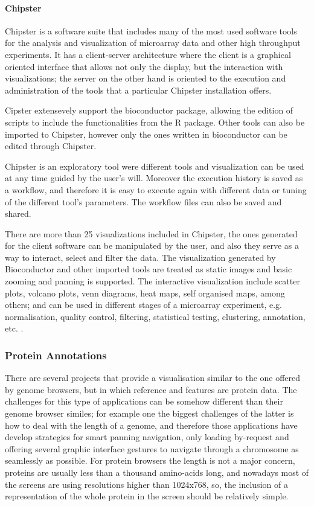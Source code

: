 \paragraph{Chipster}
Chipster is a software suite that includes many of the most used software tools for the analysis and visualization of microarray data and other high throughput experiments. It has a client-server architecture where the client is a graphical oriented interface that allows not only the display, but the interaction with visualizations; the server on the other hand is oriented to the execution and administration of the tools that a particular Chipster installation offers.

Cipster extensevely support the bioconductor package, allowing the edition of scripts to include the functionalities from the R package. Other tools can also be imported to Chipster, however only the ones written in bioconductor can be edited through Chipster.

Chipster is an exploratory tool were different tools and visualization can be used at any time guided by the user's will. Moreover the execution history is saved as a workflow, and therefore it is easy to execute again with different data or tuning of the different tool's parameters. The workflow files can also be saved and shared.

There are more than 25 visualizations included in Chipster, the ones generated for the client software can be manipulated by the user, and also they serve as a way to interact, select and filter the data. The visualization generated by Bioconductor and other imported tools are treated as static images and basic zooming and panning is supported. The interactive visualization include scatter plots, volcano plots, venn diagrams, heat maps, self organised maps, among others; and can be used in different stages of a microarray experiment, e.g. normalisation, quality control, filtering, statistical testing, clustering, annotation, etc. \cite{KAL2011}.	


\subsubsection{Protein Annotations}
There are several projects that provide a visualisation similar to the one offered by genome browsers, but in which reference and features are protein data. The challenges for this type of applications can be somehow different than their genome browser similes; for example one the biggest challenges of the latter is how to deal with the length of a genome, and therefore those applications have develop strategies for smart panning navigation, only loading by-request and offering several graphic interface gestures to navigate through a chromosome as seamlessly as possible. For protein browsers the length is not a major concern, proteins are usually less than a thousand amino-acids long, and nowadays most of the screens are using resolutions higher than 1024x768, so, the inclusion of a representation of the whole protein in the screen should be relatively simple.

